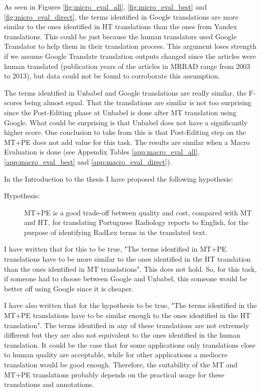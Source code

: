 As seen in Figures \ref{fig:micro_eval_all}, \ref{fig:micro_eval_best} and \ref{fig:micro_eval_direct}, the terms identified in Google translations are more similar to the ones identified in HT translations than the ones from Yandex translations. This could be just because the human translators used Google Translator to help them in their translation process. This argument loses strength if we assume Google Translate translation outputs changed since the articles were human translated (publication years of the articles in MRRAD range from 2003 to 2013), but data could not be found to corroborate this assumption. 

The terms identified in Unbabel and Google translations are really similar, the F-scores being almost equal. That the translations are similar is not too surprising since the Post-Editing phase at Unbabel is done after MT translation using Google. What could be surprising is that Unbabel does not have a significantly higher score. One conclusion to take from this is that Post-Editing step on the MT+PE does not add value for this task. The results are similar when a Macro Evaluation is done (see Appendix Tables \ref{app:macro_eval_all}, \ref{app:macro_eval_best} and \ref{app:macro_eval_direct}).

In the Introduction to the thesis I have proposed the following hypothesis:

\begin{description}
	\item[Hypothesis:] MT+PE is a good trade-off between quality and cost, compared with MT and HT, for translating Portuguese Radiology reports to English, for the purpose of identifying RadLex terms in the translated text. 
\end{description}

I have written that for this to be true, "The terms identified in MT+PE translations have to be more similar to the ones identified in the HT translation than the ones identified in MT translations". This does not hold. So, for this task, if someone had to choose between Google and Unbabel, this someone would be better off using Google since it is cheaper. 

I have also written that for the hypothesis to be true, "The terms identified in the MT+PE translations have to be similar enough to the ones identified in the HT translation". The terms identified in any of these translations are not extremely different but they are also not equivalent to the ones identified in the human translation. It could be the case that for some applications only translations close to human quality are acceptable, while for other applications a mediocre translation would be good enough. Therefore, the suitability of the MT and MT+PE translations probably depends on the practical usage for these translations and annotations. 

